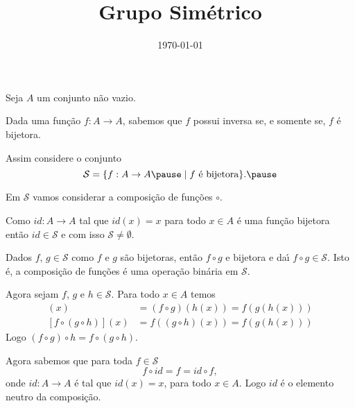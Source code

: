 \documentclass{beamer}
\title{Grupo Sim\'etrico}
\author[\autor]{\autor}
\institute[\instituto]{\instituto}
\date{\today}
\begin{document}
    \begin{frame}
        \maketitle
    \end{frame}


    \begin{frame}
        Seja $A$ um conjunto n\~ao vazio.\pause

        \vspace{.3cm}

        Dada uma fun\c{c}\~ao $f : A \to A$, sabemos que $f$ possui inversa \pause se, e somente se, $f$ \'e bijetora.\pause

        \vspace{.3cm}

        Assim considere o conjunto\pause
        \[
            \mathcal{S} = \{ f : A \to A \pause \mid f \mbox{ \'e bijetora}\}.\pause
        \]
        
        \vspace{.3cm}

        Em $\mathcal{S}$ vamos considerar a composi\c{c}\~ao de fun\c{c}\~oes $\circ$. 

        \vspace{.3cm}

        Como $id : A \to A$ tal que $id(x) = x$ para todo $x \in A$ \'e uma fun\c{c}\~ao bijetora ent\~ao $id \in \mathcal{S}$ e com isso $\mathcal{S} \ne \emptyset$. 
    \end{frame}

    \begin{frame}
        Dados $f$, $g \in \mathcal{S}$ como $f$ e $g$ s\~ao bijetoras, ent\~ao $f \circ g$ e bijetora e da{\'\i} $f \circ g \in \mathcal{S}$. Isto \'e, a composi\c{c}\~ao de fun\c{c}\~oes \'e uma opera\c{c}\~ao bin\'aria em $\mathcal{S}$.

        \vspace{.3cm}

        Agora sejam $f$, $g$ e $h \in \mathcal{S}$. Para todo $x \in A$ temos
        \begin{align*}
            [(f\circ g)\circ h](x) &= (f \circ g)(h(x)) = f(g(h(x)))\\
            [f\circ(g\circ h)](x) &= f((g\circ h)(x)) = f(g(h(x)))
        \end{align*}
        Logo $(f\circ g)\circ h = f\circ(g\circ h)$.

        \vspace{.3cm}

        Agora sabemos que para toda $f \in \mathcal{S}$
        \[
            f\circ id = f = id\circ f,
        \]
        onde $id : A \to A$ \'e tal que $id(x) = x$, para todo $x \in A$. Logo $id$ \'e o elemento neutro da composi\c{c}\~ao.

    \end{frame}
\end{document}
